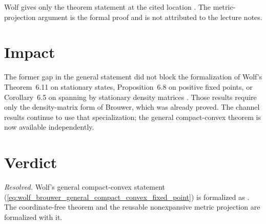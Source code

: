 \documentclass{article}
\begin{document}
Wolf gives only the theorem statement at the cited location
\cite[Theorem~6.10]{Wolf2012Quantum}. The metric-projection argument is the
formal proof and is not attributed to the lecture notes.

\section{Impact}

The former gap in the general statement did not block the formalization of
Wolf's Theorem~6.11 on stationary states, Proposition~6.8 on positive fixed
points, or Corollary~6.5 on spanning by stationary density matrices
\cite{Wolf2012Quantum}. Those results require only the density-matrix form of
Brouwer, which was already proved. The channel results continue to use that
specialization; the general compact-convex theorem is now available
independently.

\section{Verdict}

\emph{Resolved.} Wolf's general compact-convex statement
(\ref{eq:wolf_brouwer_general_compact_convex_fixed_point}) is formalized as
. The coordinate-free theorem and
the reusable nonexpansive metric projection are formalized with it.



\end{document}

